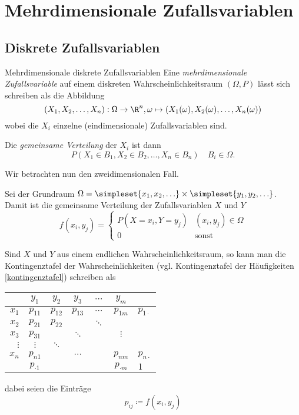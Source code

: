 \chapter{Mehrdimensionale Zufallsvariablen}
\section{Diskrete Zufallsvariablen}
\begin{definition}{Mehrdimensionale diskrete Zufallsvariablen}
	Eine \emph{mehrdimensionale Zufallsvariable} auf einem diskreten Wahrscheinlichkeitsraum $(\Omega,P)$ lässt sich schreiben als die Abbildung
	\begin{equation*}
		(X_1,X_2,\ldots,X_n):\Omega\rightarrow \R^n, \omega\mapsto (X_1(\omega),X_2(\omega),\ldots,X_n(\omega))
	\end{equation*}
	wobei die $X_i$ einzelne (eindimensionale) Zufallsvariablen sind.

	Die \emph{gemeinsame Verteilung} der $X_i$ ist dann
	\begin{equation*}
		P(X_1\in B_1,X_2\in B_2, \ldots, X_n\in B_n) \quad B_i\in\Omega.
	\end{equation*}
\end{definition}

Wir betrachten nun den zweidimensionalen Fall.

Sei der Grundraum $\Omega=\simpleset{x_1,x_2,\ldots}\times\simpleset{y_1,y_2,\ldots}$.
Damit ist die gemeinsame Verteilung der Zufallsvariablen $X$ und $Y$
\begin{equation*} 
	f(x_i,y_j)=\begin{cases}
	P(X=x_i,Y=y_j)&(x_i,y_j)\in\Omega\\
	0&\text{sonst}
	\end{cases}
\end{equation*}

Sind $X$ und $Y$ aus einem endlichen Wahrscheinlichkeitsraum, so kann man die Kontingenztafel der Wahrscheinlichkeiten (vgl. Kontingenztafel der Häufigkeiten \autoref{kontingenztafel}) schreiben als
\begin{center}
	\begin{tabular}{r|ccccc|l}
		&$y_1$&$y_2$&$y_3$&$\cdots$&$y_m$&\\\hline
		$x_1$&$p_{11}$&$p_{12}$&$p_{13}$&$\cdots$&$p_{1m}$&$p_{1\cdot}$\\
		$x_2$&$p_{21}$&$p_{22}$&&$\ddots$&&\\
		$x_3$&$p_{31}$&&$\ddots$&&$\vdots$&\\
		$\vdots$&$\vdots$&$\ddots$&&&&\\
		$x_n$&$p_{n1}$&&$\cdots$&&$p_{nm}$&$p_{n\cdot}$\\\hline
		&$p_{\cdot1}$&&&&$p_{\cdot m}$&$1$
	\end{tabular}
\end{center}
dabei seien die Einträge
\begin{equation*}
	p_{ij}\coloneqq f(x_i,y_j)
\end{equation*}

